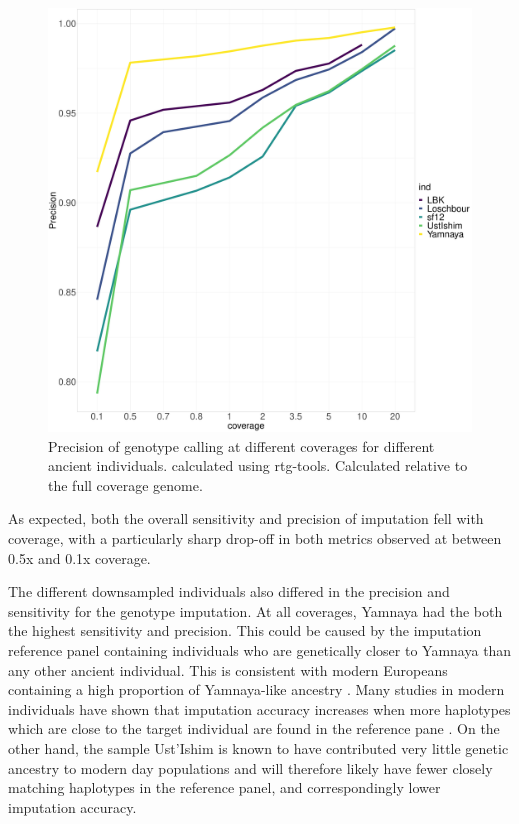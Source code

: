 \begin{figure}[htp]
    \centering
    \includegraphics[width=1.0\textwidth]{../images/chapter1/allDownsampled_rtgtools_Precision.pdf}
    \caption{Precision of genotype calling at different coverages for different ancient individuals.  calculated using rtg-tools. Calculated relative to the full coverage genome.}
    \label{fig:precision_downsampled_rtgtools}
\end{figure}

As expected, both the overall sensitivity and precision of imputation fell with coverage, with a particularly sharp drop-off in both metrics observed at between 0.5x and 0.1x coverage.

The different downsampled individuals also differed in the precision and sensitivity for the genotype imputation. At all coverages, Yamnaya had the both the highest sensitivity and precision. This could be caused by the imputation reference panel containing individuals who are genetically closer to Yamnaya than any other ancient individual. This is consistent with modern Europeans containing a high proportion of Yamnaya-like ancestry \cite{Haak2005}. Many studies in modern individuals have shown that imputation accuracy increases when more haplotypes which are close to the target individual are found in the reference pane \cite{HUANG2009235, delaneau2018integrative}. On the other hand, the sample Ust'Ishim is known to have contributed very little genetic ancestry to modern day populations \cite{Prufer2014} and will therefore likely have fewer closely matching haplotypes in the reference panel, and correspondingly lower imputation accuracy. 

